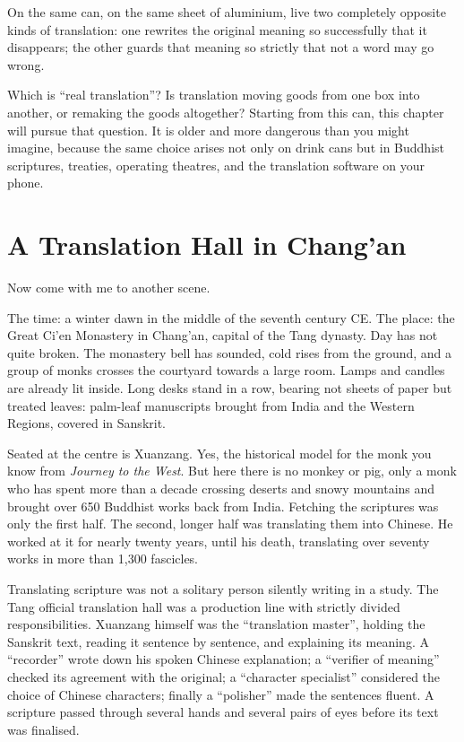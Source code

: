 On the same can, on the same sheet of aluminium, live two completely opposite kinds of translation: one rewrites the original meaning so successfully that it disappears; the other guards that meaning so strictly that not a word may go wrong.

Which is ``real translation''? Is translation moving goods from one box into another, or remaking the goods altogether? Starting from this can, this chapter will pursue that question. It is older and more dangerous than you might imagine, because the same choice arises not only on drink cans but in Buddhist scriptures, treaties, operating theatres, and the translation software on your phone.

\section{A Translation Hall in Chang'an}
Now come with me to another scene.

The time: a winter dawn in the middle of the seventh century CE. The place: the Great Ci'en Monastery in Chang'an, capital of the Tang dynasty. Day has not quite broken. The monastery bell has sounded, cold rises from the ground, and a group of monks crosses the courtyard towards a large room. Lamps and candles are already lit inside. Long desks stand in a row, bearing not sheets of paper but treated leaves: palm-leaf manuscripts brought from India and the Western Regions, covered in Sanskrit.

Seated at the centre is Xuanzang. Yes, the historical model for the monk you know from \emph{Journey to the West}. But here there is no monkey or pig, only a monk who has spent more than a decade crossing deserts and snowy mountains and brought over 650 Buddhist works back from India. Fetching the scriptures was only the first half. The second, longer half was translating them into Chinese. He worked at it for nearly twenty years, until his death, translating over seventy works in more than 1,300 fascicles.

Translating scripture was not a solitary person silently writing in a study. The Tang official translation hall was a production line with strictly divided responsibilities. Xuanzang himself was the ``translation master'', holding the Sanskrit text, reading it sentence by sentence, and explaining its meaning. A ``recorder'' wrote down his spoken Chinese explanation; a ``verifier of meaning'' checked its agreement with the original; a ``character specialist'' considered the choice of Chinese characters; finally a ``polisher'' made the sentences fluent. A scripture passed through several hands and several pairs of eyes before its text was finalised.


